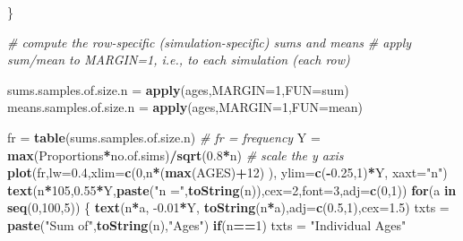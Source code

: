 \documentclass[]{book}
\newenvironment{Shaded}{\begin{snugshade}}{\end{snugshade}}
\newcommand{\CommentTok}[1]{\textcolor[rgb]{0.56,0.35,0.01}{\textit{#1}}}
\newcommand{\ControlFlowTok}[1]{\textcolor[rgb]{0.13,0.29,0.53}{\textbf{#1}}}
\newcommand{\DataTypeTok}[1]{\textcolor[rgb]{0.13,0.29,0.53}{#1}}
\newcommand{\DecValTok}[1]{\textcolor[rgb]{0.00,0.00,0.81}{#1}}
\newcommand{\FloatTok}[1]{\textcolor[rgb]{0.00,0.00,0.81}{#1}}
\newcommand{\KeywordTok}[1]{\textcolor[rgb]{0.13,0.29,0.53}{\textbf{#1}}}
\newcommand{\NormalTok}[1]{#1}
\newcommand{\OperatorTok}[1]{\textcolor[rgb]{0.81,0.36,0.00}{\textbf{#1}}}
\newcommand{\StringTok}[1]{\textcolor[rgb]{0.31,0.60,0.02}{#1}}
\begin{document}
\begin{Shaded}
\begin{Highlighting}[]
\NormalTok{   \} }
  
   \CommentTok{# compute the row-specific (simulation-specific) sums and means}
   \CommentTok{# apply sum/mean to MARGIN=1, i.e., to each simulation (each row)}

\NormalTok{   sums.samples.of.size.n =}\StringTok{ }\KeywordTok{apply}\NormalTok{(ages,}\DataTypeTok{MARGIN=}\DecValTok{1}\NormalTok{,}\DataTypeTok{FUN=}\NormalTok{sum)}
\NormalTok{   means.samples.of.size.n =}\StringTok{ }\KeywordTok{apply}\NormalTok{(ages,}\DataTypeTok{MARGIN=}\DecValTok{1}\NormalTok{,}\DataTypeTok{FUN=}\NormalTok{mean)}

\NormalTok{   fr =}\StringTok{ }\KeywordTok{table}\NormalTok{(sums.samples.of.size.n)          }\CommentTok{# fr = frequency}
\NormalTok{   Y =}\StringTok{ }\KeywordTok{max}\NormalTok{(Proportions}\OperatorTok{*}\NormalTok{no.of.sims)}\OperatorTok{/}\KeywordTok{sqrt}\NormalTok{(}\FloatTok{0.8}\OperatorTok{*}\NormalTok{n) }\CommentTok{# scale the y axis}
   \KeywordTok{plot}\NormalTok{(fr,}\DataTypeTok{lw=}\FloatTok{0.4}\NormalTok{,}\DataTypeTok{xlim=}\KeywordTok{c}\NormalTok{(}\DecValTok{0}\NormalTok{,n}\OperatorTok{*}\NormalTok{(}\KeywordTok{max}\NormalTok{(AGES)}\OperatorTok{+}\DecValTok{12}\NormalTok{) ), }
                  \DataTypeTok{ylim=}\KeywordTok{c}\NormalTok{(}\OperatorTok{-}\FloatTok{0.25}\NormalTok{,}\DecValTok{1}\NormalTok{)}\OperatorTok{*}\NormalTok{Y, }\DataTypeTok{xaxt=}\StringTok{"n"}\NormalTok{)}
   \KeywordTok{text}\NormalTok{(n}\OperatorTok{*}\DecValTok{105}\NormalTok{,}\FloatTok{0.55}\OperatorTok{*}\NormalTok{Y,}\KeywordTok{paste}\NormalTok{(}\StringTok{"n ="}\NormalTok{,}\KeywordTok{toString}\NormalTok{(n)),}\DataTypeTok{cex=}\DecValTok{2}\NormalTok{,}\DataTypeTok{font=}\DecValTok{3}\NormalTok{,}\DataTypeTok{adj=}\KeywordTok{c}\NormalTok{(}\DecValTok{0}\NormalTok{,}\DecValTok{1}\NormalTok{))}
   \ControlFlowTok{for}\NormalTok{(a }\ControlFlowTok{in} \KeywordTok{seq}\NormalTok{(}\DecValTok{0}\NormalTok{,}\DecValTok{100}\NormalTok{,}\DecValTok{5}\NormalTok{)) \{}
     \KeywordTok{text}\NormalTok{(n}\OperatorTok{*}\NormalTok{a, }\FloatTok{-0.01}\OperatorTok{*}\NormalTok{Y, }\KeywordTok{toString}\NormalTok{(n}\OperatorTok{*}\NormalTok{a),}\DataTypeTok{adj=}\KeywordTok{c}\NormalTok{(}\FloatTok{0.5}\NormalTok{,}\DecValTok{1}\NormalTok{),}\DataTypeTok{cex=}\FloatTok{1.5}\NormalTok{)}
\NormalTok{     txts =}\StringTok{ }\KeywordTok{paste}\NormalTok{(}\StringTok{"Sum of"}\NormalTok{,}\KeywordTok{toString}\NormalTok{(n),}\StringTok{"Ages"}\NormalTok{)}
     \ControlFlowTok{if}\NormalTok{(n}\OperatorTok{==}\DecValTok{1}\NormalTok{) txts =}\StringTok{ "Individual Ages"}

\end{Highlighting}
\end{Shaded}
\end{document}
